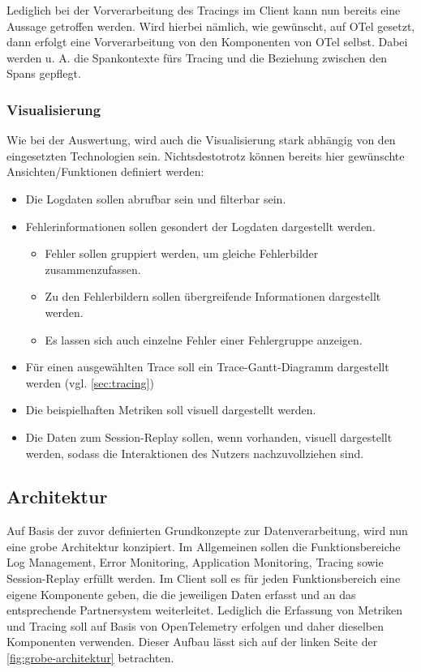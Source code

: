 	Lediglich bei der Vorverarbeitung des Tracings im Client kann nun bereits eine Aussage getroffen werden. Wird hierbei nämlich, wie gewünscht, auf OTel gesetzt, dann erfolgt eine Vorverarbeitung von den Komponenten von OTel selbst. Dabei werden u. A. die Spankontexte fürs Tracing und die Beziehung zwischen den Spans gepflegt.
	
	\subsubsection{Visualisierung}
		
	Wie bei der Auswertung, wird auch die Visualisierung stark abhängig von den eingesetzten Technologien sein. Nichtsdestotrotz können bereits hier gewünschte Ansichten/Funktionen definiert werden:
	
	\begin{itemize}
		\item Die Logdaten sollen abrufbar sein und filterbar sein.
		\item Fehlerinformationen sollen gesondert der Logdaten dargestellt werden.
		\begin{itemize}
			\item Fehler sollen gruppiert werden, um gleiche Fehlerbilder zusammenzufassen.
			\item Zu den Fehlerbildern sollen übergreifende Informationen dargestellt werden.
			\item Es lassen sich auch einzelne Fehler einer Fehlergruppe anzeigen.
		\end{itemize}
		\item Für einen ausgewählten Trace soll ein Trace-Gantt-Diagramm dargestellt werden (vgl. \autoref{sec:tracing})
		\item Die beispielhaften Metriken soll visuell dargestellt werden.
		\item Die Daten zum Session-Replay sollen, wenn vorhanden, visuell dargestellt werden, sodass die Interaktionen des Nutzers nachzuvollziehen sind.
	\end{itemize}
	
	\subsection{Architektur}

	Auf Basis der zuvor definierten Grundkonzepte zur Datenverarbeitung, wird nun eine grobe Architektur konzipiert. Im Allgemeinen sollen die Funktionsbereiche Log Management, Error Monitoring, Application Monitoring, Tracing sowie Session-Replay erfüllt werden. Im Client soll es für jeden Funktionsbereich eine eigene Komponente geben, die die jeweiligen Daten erfasst und an das entsprechende Partnersystem weiterleitet. Lediglich die Erfassung von Metriken und Tracing soll auf Basis von OpenTelemetry erfolgen und daher dieselben Komponenten verwenden. Dieser Aufbau lässt sich auf der linken Seite der \autoref{fig:grobe-architektur} betrachten.
	
